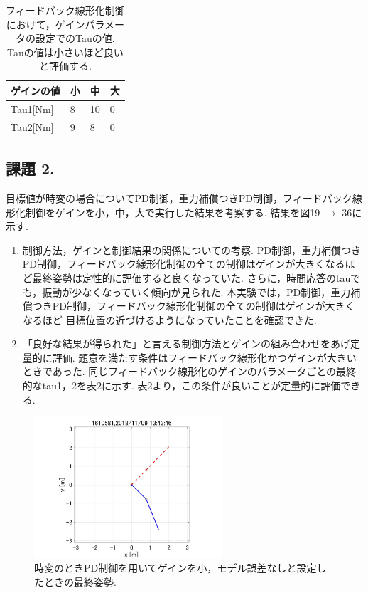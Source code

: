 \documentclass[twocolumn, 10pt,a4j]{jsarticle}
\begin{document}
    \begin{table}[H]
      \begin{center}
        \caption{フィードバック線形化制御におけて，ゲインパラメータの設定でのTauの値. Tauの値は小さいほど良いと評価する.}
        \begin{tabular}{llll}
        ゲインの値 & 小 & 中  & 大 \\ \hline
        Tau1[Nm] & 8 & 10 & 0 \\
        Tau2[Nm] & 9 & 8  & 0
        \end{tabular}
      \end{center}
    \end{table}

  \subsection{課題 2.}
    目標値が時変の場合についてPD制御，重力補償つきPD制御，フィードバック線形化制御をゲインを小，中，大で実行した結果を考察する. 結果を図19 $\to$ 36に示す.
    \begin{enumerate}
      \item 制御方法，ゲインと制御結果の関係についての考察.
        PD制御，重力補償つきPD制御，フィードバック線形化制御の全ての制御はゲインが大きくなるほど最終姿勢は定性的に評価すると良くなっていた.
        さらに，時間応答のtauでも，振動が少なくなっていく傾向が見られた. 本実験では，PD制御，重力補償つきPD制御，フィードバック線形化制御の全ての制御はゲインが大きくなるほど
        目標位置の近づけるようになっていたことを確認できた.

      \item 「良好な結果が得られた」と言える制御方法とゲインの組み合わせをあげ定量的に評価.
        題意を満たす条件はフィードバック線形化かつゲインが大きいときであった. 同じフィードバック線形化のゲインのパラメータごとの最終的なtau1，2を表2に示す. 表2より，この条件が良いことが定量的に評価できる.
    \end{enumerate}



    \begin{figure}[H]
      \begin{center}
        \includegraphics[width=7cm]{../img/img/kansetu_PD_zihen_small_no_model_gosa_saisyu_sisei.jpg}
        \caption{時変のときPD制御を用いてゲインを小，モデル誤差なしと設定したときの最終姿勢.}
      \end{center}
    \end{figure}
\end{document}
